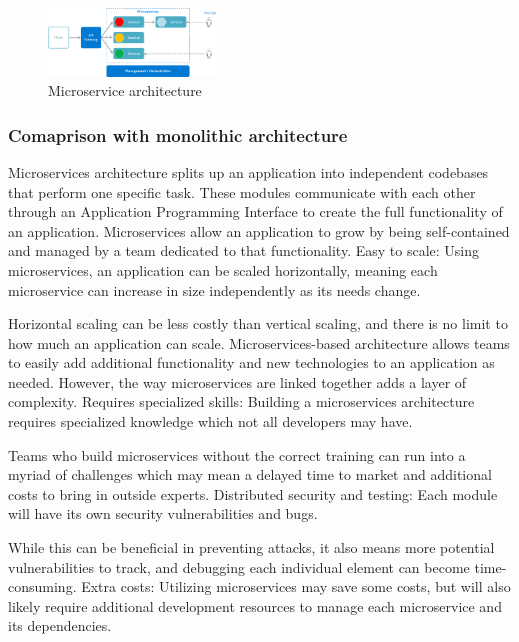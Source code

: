 \documentclass[conference]{IEEEtran}
\begin{document}
\begin{figure}[!h]
    \begin{center}
        \includegraphics[width=0.4\textwidth]{figures/microservices-logical.png}
    \end{center}
    \caption{Microservice architecture}
    \label{fig:microservice}
\end{figure}

\subsubsection{Comaprison with monolithic architecture}

Microservices architecture splits up an application into independent codebases that perform one specific task. These modules communicate with each other through an Application Programming Interface to create the full functionality of an application.
Microservices allow an application to grow by being self-contained and managed by a team dedicated to that functionality.
Easy to scale: Using microservices, an application can be scaled horizontally, meaning each microservice can increase in size independently as its needs change.

Horizontal scaling can be less costly than vertical scaling, and there is no limit to how much an application can scale.
Microservices-based architecture allows teams to easily add additional functionality and new technologies to an application as needed. However, the way microservices are linked together adds a layer of complexity.
Requires specialized skills: Building a microservices architecture requires specialized knowledge which not all developers may have.

Teams who build microservices without the correct training can run into a myriad of challenges which may mean a delayed time to market and additional costs to bring in outside experts.
Distributed security and testing: Each module will have its own security vulnerabilities and bugs.

While this can be beneficial in preventing attacks, it also means more potential vulnerabilities to track, and debugging each individual element can become time-consuming.
Extra costs: Utilizing microservices may save some costs, but will also likely require additional development resources to manage each microservice and its dependencies.
\end{document}
